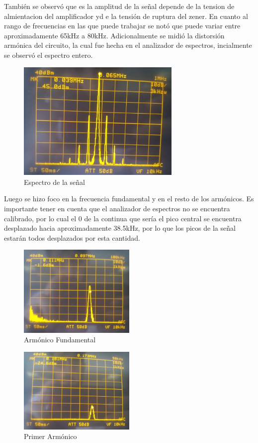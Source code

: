 También se observó que es la amplitud de la señal  depende de la tension de almientacion del amplificador yd e la tensión de ruptura del zener. En cuanto al rango de frecuencias en las que puede trabajar se notó que puede variar entre aproximadamente 65kHz a 80kHz.
Adicionalmente se midió la distorsión armónica del circuito, la cual fue hecha en el analizador de espectros, incialmente se observó el espectro entero.
\begin{figure}[H]
	\centering
	\includegraphics[width=0.7\textwidth]{Imagenes-Ej1/Espectro.jpeg}
	\caption{Espectro de la señal}
	\label{fig:Espectro}
\end{figure}
Luego se hizo foco en la frecuencia fundamental y en el resto de los armónicos. Es importante tener en cuenta que el analizador de espectros no se encuentra calibrado, por lo cual el 0 de la continua que sería el pico central se encuentra desplazado hacia aproximadamente 38.5kHz, por lo que los picos de la señal estarán todos desplazados por esta cantidad.
\begin{figure}[H]
	\centering
	\includegraphics[width=0.5\textwidth]{Imagenes-Ej1/Fundamental.jpeg}
	\caption{Armónico Fundamental}
	\label{fig:Fund}
\end{figure}
\begin{figure}[H]
	\centering
	\includegraphics[width=0.5\textwidth]{Imagenes-Ej1/1Armonico.jpeg}
	\caption{Primer Armónico}
	\label{fig:1er}
\end{figure}
